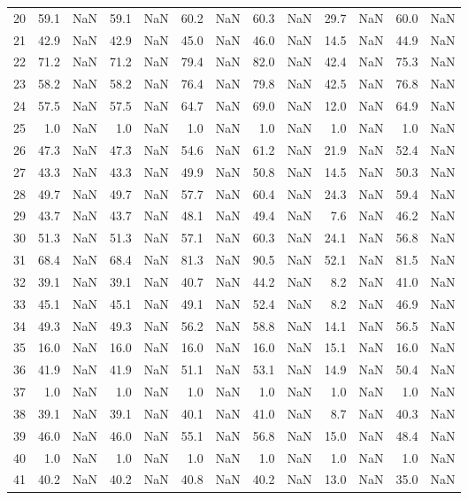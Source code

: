 \begin{tabular}{lrrrrrrrrrrrr}
20 & 59.1 & NaN & 59.1 & NaN & 60.2 & NaN & 60.3 & NaN & 29.7 & NaN & 60.0 & NaN \\
21 & 42.9 & NaN & 42.9 & NaN & 45.0 & NaN & 46.0 & NaN & 14.5 & NaN & 44.9 & NaN \\
22 & 71.2 & NaN & 71.2 & NaN & 79.4 & NaN & 82.0 & NaN & 42.4 & NaN & 75.3 & NaN \\
23 & 58.2 & NaN & 58.2 & NaN & 76.4 & NaN & 79.8 & NaN & 42.5 & NaN & 76.8 & NaN \\
24 & 57.5 & NaN & 57.5 & NaN & 64.7 & NaN & 69.0 & NaN & 12.0 & NaN & 64.9 & NaN \\
25 & 1.0 & NaN & 1.0 & NaN & 1.0 & NaN & 1.0 & NaN & 1.0 & NaN & 1.0 & NaN \\
26 & 47.3 & NaN & 47.3 & NaN & 54.6 & NaN & 61.2 & NaN & 21.9 & NaN & 52.4 & NaN \\
27 & 43.3 & NaN & 43.3 & NaN & 49.9 & NaN & 50.8 & NaN & 14.5 & NaN & 50.3 & NaN \\
28 & 49.7 & NaN & 49.7 & NaN & 57.7 & NaN & 60.4 & NaN & 24.3 & NaN & 59.4 & NaN \\
29 & 43.7 & NaN & 43.7 & NaN & 48.1 & NaN & 49.4 & NaN & 7.6 & NaN & 46.2 & NaN \\
30 & 51.3 & NaN & 51.3 & NaN & 57.1 & NaN & 60.3 & NaN & 24.1 & NaN & 56.8 & NaN \\
31 & 68.4 & NaN & 68.4 & NaN & 81.3 & NaN & 90.5 & NaN & 52.1 & NaN & 81.5 & NaN \\
32 & 39.1 & NaN & 39.1 & NaN & 40.7 & NaN & 44.2 & NaN & 8.2 & NaN & 41.0 & NaN \\
33 & 45.1 & NaN & 45.1 & NaN & 49.1 & NaN & 52.4 & NaN & 8.2 & NaN & 46.9 & NaN \\
34 & 49.3 & NaN & 49.3 & NaN & 56.2 & NaN & 58.8 & NaN & 14.1 & NaN & 56.5 & NaN \\
35 & 16.0 & NaN & 16.0 & NaN & 16.0 & NaN & 16.0 & NaN & 15.1 & NaN & 16.0 & NaN \\
36 & 41.9 & NaN & 41.9 & NaN & 51.1 & NaN & 53.1 & NaN & 14.9 & NaN & 50.4 & NaN \\
37 & 1.0 & NaN & 1.0 & NaN & 1.0 & NaN & 1.0 & NaN & 1.0 & NaN & 1.0 & NaN \\
38 & 39.1 & NaN & 39.1 & NaN & 40.1 & NaN & 41.0 & NaN & 8.7 & NaN & 40.3 & NaN \\
39 & 46.0 & NaN & 46.0 & NaN & 55.1 & NaN & 56.8 & NaN & 15.0 & NaN & 48.4 & NaN \\
40 & 1.0 & NaN & 1.0 & NaN & 1.0 & NaN & 1.0 & NaN & 1.0 & NaN & 1.0 & NaN \\
41 & 40.2 & NaN & 40.2 & NaN & 40.8 & NaN & 40.2 & NaN & 13.0 & NaN & 35.0 & NaN \\

\end{tabular}
